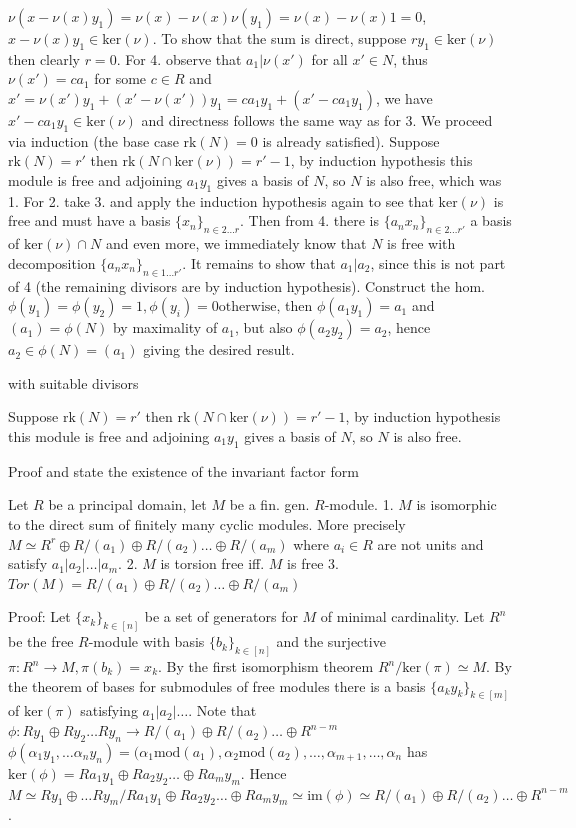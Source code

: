 \(\nu(x - \nu(x)y_1) = \nu(x) - \nu(x)\nu(y_1) = \nu(x) - \nu(x) 1 = 0\), \(x - \nu(x)y_1 \in \text{ker}(\nu)\). To show that the sum is direct, suppose \(ry_1 \in \text{ker}(\nu)\) then clearly \(r = 0\).
For 4. observe that \(a_1 | \nu(x')\) for all \(x' \in N\), thus \(\nu(x') = ca_1\) for some \(c \in R\) and \(x' = \nu(x')y_1 + (x' - \nu(x'))y_1 = ca_1y_1 + (x' - ca_1y_1)\), we have \(x' - ca_1y_1 \in \text{ker}(\nu)\) and directness follows the same way as for 3.
We proceed via induction (the base case \(\text{rk}(N) = 0\) is already satisfied).
Suppose \(\text{rk}(N) = r'\) then \(\text{rk}(N \cap \text{ker}(\nu)) = r' - 1\), by induction hypothesis this module is free and adjoining \(a_1y_1\) gives a basis of \(N\), so \(N\) is also free, which was 1.
For 2. take 3. and apply the induction hypothesis again to see that \(\text{ker}(\nu)\) is free and must have a basis \(\{x_n\}_{n \in 2 \dots r}\). Then from 4. there is \(\{a_nx_n\}_{n \in 2 \dots r'}\)
a basis of \(\text{ker}(\nu) \cap N\) and even more, we immediately know that \(N\) is free with decomposition \(\{a_nx_n\}_{n \in 1 \dots r'}\). It remains to show that \(a_1 | a_2\), since this is not part of 4 (the remaining divisors are by induction hypothesis). Construct the hom. \(\phi(y_1) = \phi(y_2) = 1, \phi(y_i) = 0 \text{otherwise}\), then \(\phi(a_1y_1) = a_1\) and \((a_1) = \phi(N)\) by maximality of \(a_1\), but also \(\phi(a_2y_2) = a_2\), hence \(a_2 \in \phi(N) = (a_1)\) giving the desired result.


with suitable divisors


Suppose \(\text{rk}(N) = r'\) then \(\text{rk}(N \cap \text{ker}(\nu)) = r' - 1\), by induction hypothesis this module is free and adjoining \(a_1y_1\) gives a basis of \(N\), so \(N\) is also free.



Proof and state the existence of the invariant factor form

Let \(R\) be a principal domain, let \(M\) be a fin. gen. \(R\)-module.
1. \(M\) is isomorphic to the direct sum of finitely many cyclic modules. More precisely
\(M \simeq R^{r} \oplus R/(a_1) \oplus R/(a_2) \dots \oplus R/(a_m)\)
where \(a_i \in R\) are not units and satisfy \(a_1 | a_2 | \dots | a_m\).
2. \(M\) is torsion free iff. \(M\) is free
3. \(Tor(M) = R/(a_1) \oplus R/(a_2) \dots \oplus R/(a_m)\)


Proof:
Let \(\{x_k\}_{k \in [n]}\) be a set of generators for \(M\) of minimal cardinality. Let \(R^{n}\) be the free \(R\)-module 
with basis \(\{b_k\}_{k \in [n]}\) and the surjective \(\pi : R^{n} \to M, \pi(b_k) = x_k\). By the first isomorphism theorem
\(R^{n}/\text{ker}(\pi) \simeq M\). By the theorem of bases for submodules of free modules there is a basis \(\{a_ky_k\}_{k \in [m]}\)
of \(\text{ker}(\pi)\) satisfying \(a_1 | a_2 | \dots\). Note that \(\phi: Ry_1 \oplus Ry_2 \dots Ry_n \to R/(a_1) \oplus R/(a_2) \dots \oplus R^{n-m}\)
\(\phi(\alpha_1 y_1, \dots \alpha_n y_n) = (\alpha_1 \text{mod} (a_1), \alpha_2 \text{mod} (a_2), \dots, \alpha_{m+1}, \dots, \alpha_n \) has \(\text{ker}(\phi) = Ra_1y_1 \oplus Ra_2y_2 \dots \oplus Ra_my_m\). 
Hence \(M \simeq Ry_1 \oplus \dots Ry_m/Ra_1y_1 \oplus Ra_2y_2 \dots \oplus Ra_my_m \simeq \text{im}(\phi) \simeq R/(a_1) \oplus R/(a_2) \dots \oplus R^{n-m} \).

